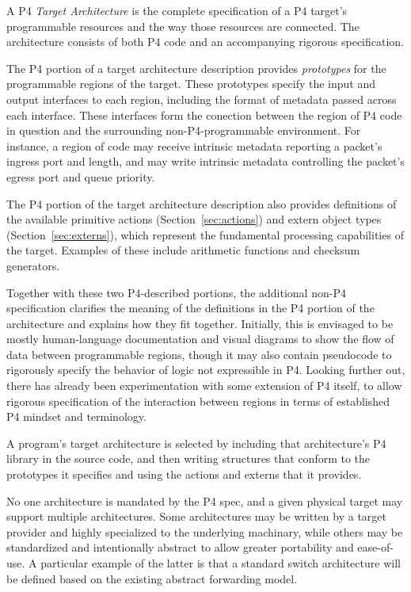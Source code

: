 \documentclass[12pt]{article}
\begin{document}
A P4 \textit{Target Architecture} is the complete specification of a P4
target's programmable resources and the way those resources are connected.
The architecture consists of both P4 code and an accompanying rigorous
specification.


The P4 portion of a target architecture description provides
\textit{prototypes} for the programmable regions of the target. These
prototypes specify the input and output interfaces to each region, including
the format of metadata passed across each interface.  These interfaces form
the conection between the region of P4 code in question and the surrounding
non-P4-programmable environment.  For instance, a region of code may receive
intrinsic metadata reporting a packet's ingress port and length, and may write
intrinsic metadata controlling the packet's egress port and queue priority.

The P4 portion of the target architecture description also provides
definitions of the available primitive actions (Section~\ref{sec:actions}) and
extern object types (Section~\ref{sec:externs}), which represent the
fundamental processing capabilities of the target.  Examples of these include
arithmetic functions and checksum generators.

Together with these two P4-described portions, the additional non-P4
specification clarifies the meaning of the definitions in the P4 portion of
the architecture and explains how they fit together. Initially, this is
envisaged to be mostly human-language documentation and visual diagrams to
show the flow of data between programmable regions, though it may also
contain pseudocode to rigorously specify the behavior of logic not expressible
in P4.  Looking further out, there has already been experimentation with
some extension of P4 itself, to allow rigorous specification of the interaction
between regions in terms of established P4 mindset and terminology.


A program's target architecture is selected by including that architecture's P4
library in the source code, and then writing structures that conform to the
prototypes it specifies and using the actions and externs that it provides.

No one architecture is mandated by the P4 spec, and a given physical target may 
support multiple architectures.  Some architectures may be written by a target
provider and highly specialized to the underlying machinary, while others may
be standardized and intentionally abstract to allow greater portability and
ease-of-use.  A particular example of the latter is that a standard switch
architecture will be defined based on the existing abstract forwarding model.
\end{document}
